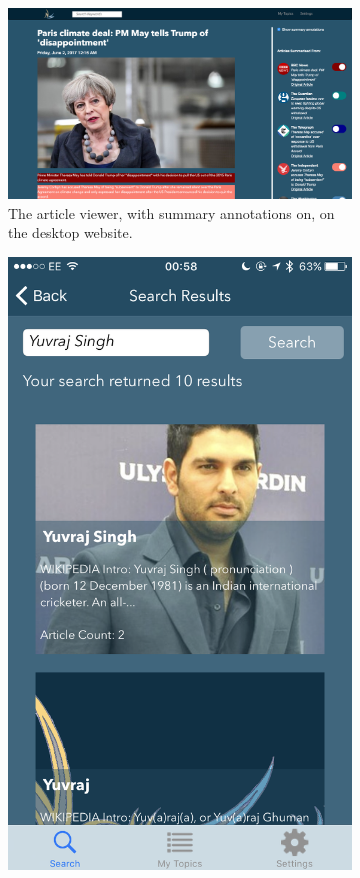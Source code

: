\documentclass[12pt]{article}
\begin{document}
\begin{figure}[ht!]
  \centering
  \begin{subfigure}[t]{0.6\textwidth}
        \includegraphics[width=\textwidth]{DesktopScreenshot}
        \caption{The article viewer, with summary annotations on, on the desktop website.}
    \end{subfigure}
   \qquad
    \begin{subfigure}[t]{0.3\textwidth}
    \includegraphics[width=\textwidth]{iPhoneScreenshot.PNG}

\end{subfigure}
\end{figure}
\end{document}
